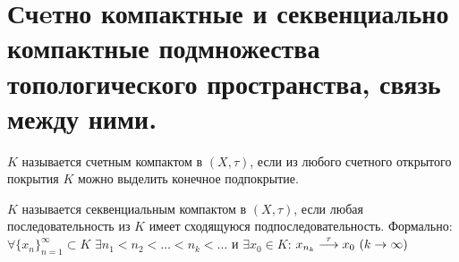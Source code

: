 \newpage
\section{Счeтно компактные и секвенциально компактные подмножества топологического пространства, связь между ними.}

\begin{definition}
	$K$ называется счетным компактом в $(X, \tau)$, если из любого счетного открытого покрытия $K$ можно выделить конечное подпокрытие.
\end{definition}

\begin{definition}
	$K$ называется секвенциальным компактом в $(X, \tau)$, если любая последовательность из $K$ имеет сходящуюся подпоследовательность. Формально: $\forall \{x_n\}_{n=1}^{\infty} \subset K$ $\exists n_1 < n_2 < \dots < n_k < \dots$ и $\exists x_0 \in K$: $x_{n_k} \stackrel{\tau}{\longrightarrow}x_0 \ (k \rightarrow \infty)$
\end{definition}

